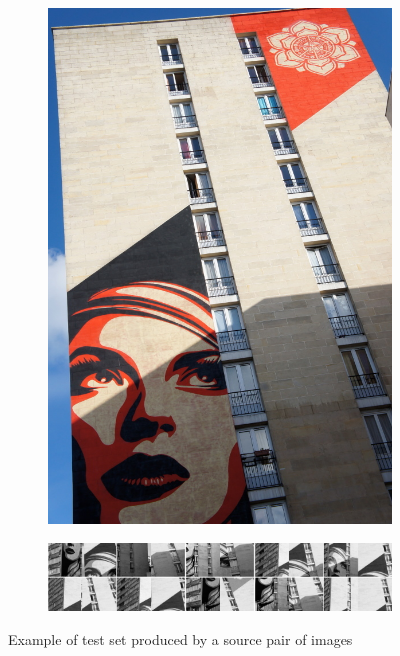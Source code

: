 \documentclass[conference]{IEEEtran}
\begin{document}
\begin{figure}
{\begin{subfigure}[t]{0.048\textwidth}
			\includegraphics[width=\textwidth]{images/pair_example2}
			\label{fig:fairey2}
		\end{subfigure}%
		\enspace %
		\begin{subfigure}[t]{0.36\textwidth}
			\centering
			\includegraphics[width=\textwidth]{images/crop_examples}
		\end{subfigure}%
	}%
	\caption{Example of test set produced by a source pair of images}
	\label{fig:fairey}
\end{figure}
\end{document}
